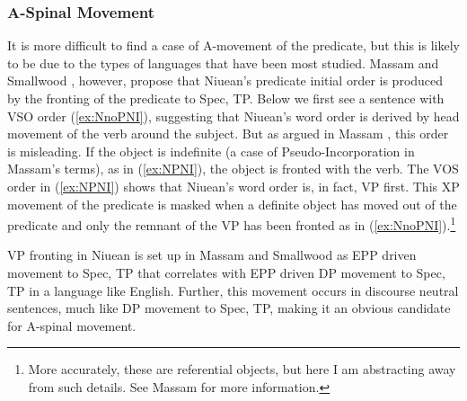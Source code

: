 \documentclass[output=paper,colorlinks,citecolor=brown,
]{langscibook}
\begin{document}

\subsubsection{A-Spinal Movement}

It is more difficult to find a case of A-movement of the predicate, but this is likely to be due to the types of languages that have been most studied.  Massam and Smallwood \citeyearpar{Massam:1997}, however, propose that Niuean's predicate initial order is produced by the fronting of the predicate to Spec, TP.  Below we first see a sentence with VSO order (\ref{ex:NnoPNI}), suggesting that Niuean's word order is derived by head movement of the verb around the subject.  But as argued in Massam \citeyearpar{Massam:2001}, this order is misleading. If the object is indefinite (a case of Pseudo-Incorporation in Massam's terms), as in (\ref{ex:NPNI}), the object is fronted with the verb. The VOS order in (\ref{ex:NPNI}) shows that Niuean's word order is, in fact, VP first.  This XP movement of the predicate is masked when a definite object has moved out of the predicate and only the remnant of the VP has been fronted as in (\ref{ex:NnoPNI}).\footnote{More accurately, these are referential objects, but here I am abstracting away from such details.  See Massam \citeyearpar{Massam:2020} for more information.}


	\z
\z

VP fronting in Niuean is set up in Massam and Smallwood \citeyearpar{Massam:1997} as EPP driven movement to Spec, TP that correlates with EPP driven DP movement to Spec, TP in a language like English.  Further, this movement occurs in discourse neutral sentences, much like DP movement to Spec, TP, making it an obvious candidate for A-spinal movement. 
\end{document}
